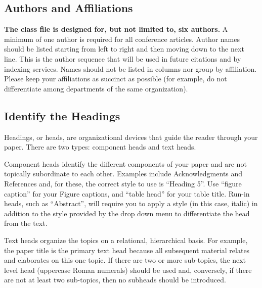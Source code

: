 \documentclass[conference]{IEEEtran}
\begin{document}


\subsection{Authors and Affiliations}
\textbf{The class file is designed for, but not limited to, six authors.} A 
minimum of one author is required for all conference articles. Author names 
should be listed starting from left to right and then moving down to the 
next line. This is the author sequence that will be used in future citations 
and by indexing services. Names should not be listed in columns nor group by 
affiliation. Please keep your affiliations as succinct as possible (for 
example, do not differentiate among departments of the same organization).

\subsection{Identify the Headings}
Headings, or heads, are organizational devices that guide the reader through 
your paper. There are two types: component heads and text heads.

Component heads identify the different components of your paper and are not 
topically subordinate to each other. Examples include Acknowledgments and 
References and, for these, the correct style to use is ``Heading 5''. Use 
``figure caption'' for your Figure captions, and ``table head'' for your 
table title. Run-in heads, such as ``Abstract'', will require you to apply a 
style (in this case, italic) in addition to the style provided by the drop 
down menu to differentiate the head from the text.

Text heads organize the topics on a relational, hierarchical basis. For 
example, the paper title is the primary text head because all subsequent 
material relates and elaborates on this one topic. If there are two or more 
sub-topics, the next level head (uppercase Roman numerals) should be used 
and, conversely, if there are not at least two sub-topics, then no subheads 
should be introduced.
\end{document}
